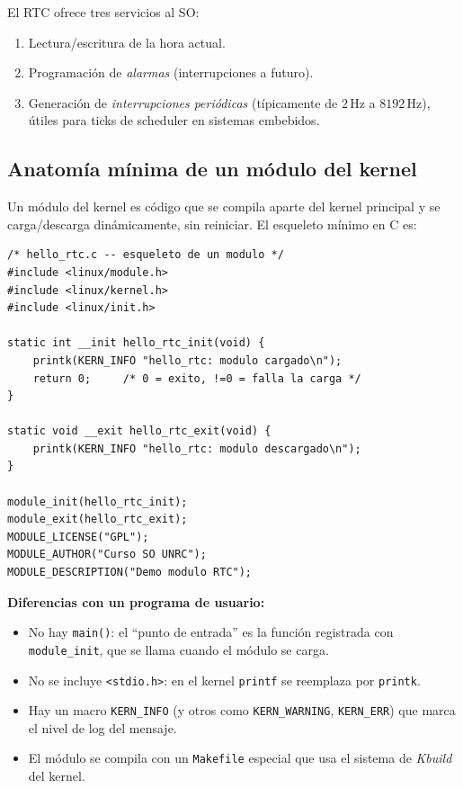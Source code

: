\documentclass[11pt,a4paper]{article}
\begin{document}
El RTC ofrece tres servicios al SO:

\begin{enumerate}[leftmargin=*,nosep]
    \item Lectura/escritura de la hora actual.
    \item Programación de \emph{alarmas} (interrupciones a futuro).
    \item Generación de \emph{interrupciones periódicas} (típicamente
        de $2$\,Hz a $8192$\,Hz), útiles para ticks de scheduler en
        sistemas embebidos.
\end{enumerate}

\subsection*{Anatomía mínima de un módulo del kernel}

Un módulo del kernel es código que se compila aparte del kernel
principal y se carga/descarga dinámicamente, sin reiniciar. El
esqueleto mínimo en C es:

\begin{lstlisting}[style=cstyle]
/* hello_rtc.c -- esqueleto de un modulo */
#include <linux/module.h>
#include <linux/kernel.h>
#include <linux/init.h>

static int __init hello_rtc_init(void) {
    printk(KERN_INFO "hello_rtc: modulo cargado\n");
    return 0;     /* 0 = exito, !=0 = falla la carga */
}

static void __exit hello_rtc_exit(void) {
    printk(KERN_INFO "hello_rtc: modulo descargado\n");
}

module_init(hello_rtc_init);
module_exit(hello_rtc_exit);
MODULE_LICENSE("GPL");
MODULE_AUTHOR("Curso SO UNRC");
MODULE_DESCRIPTION("Demo modulo RTC");
\end{lstlisting}

\textbf{Diferencias con un programa de usuario:}

\begin{itemize}[leftmargin=*,nosep]
    \item No hay \texttt{main()}: el ``punto de entrada'' es la función
        registrada con \texttt{module\_init}, que se llama cuando el
        módulo se carga.
    \item No se incluye \texttt{<stdio.h>}: en el kernel \texttt{printf}
        se reemplaza por \texttt{printk}.
    \item Hay un macro \texttt{KERN\_INFO} (y otros como
        \texttt{KERN\_WARNING}, \texttt{KERN\_ERR}) que marca el nivel
        de log del mensaje.
    \item El módulo se compila con un \texttt{Makefile} especial que
        usa el sistema de \emph{Kbuild} del kernel.
\end{itemize}
\end{document}
